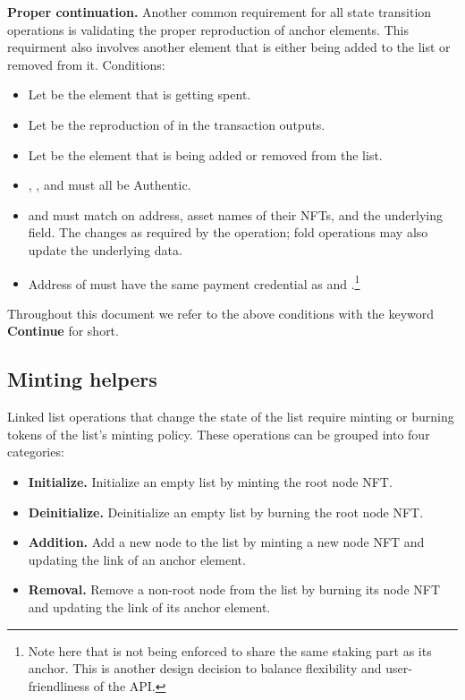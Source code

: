 \documentclass[../midgard.tex]{subfiles}
\begin{document}
\textbf{Proper continuation.} Another common requirement for all state transition operations is validating the proper reproduction of anchor elements.
This requirment also involves another element that is either being added to the list or removed from it.
Conditions:
\begin{itemize}
  \item Let  be the element that is getting spent.
  \item Let  be the reproduction of  in the transaction outputs.
  \item Let  be the element that is being added or removed from the list.
  \item {}, , and  must all be Authentic.
  \item {} and  must match on address, asset names of their NFTs, and the underlying  field. The  changes as required by the operation; fold operations may also update the underlying data.
  \item Address of  must have the same payment credential as  and .\footnote{Note here that  is not being enforced to share the same staking part as its anchor.
    This is another design decision to balance flexibility and user-friendliness of the API.}
\end{itemize}

Throughout this document we refer to the above conditions with the keyword \textbf{Continue} for short.

\subsection{Minting helpers}
\label{h:list-minting-helpers}

Linked list operations that change the state of the list require minting or burning tokens of the list's minting policy.
These operations can be grouped into four categories:
\begin{itemize}
  \item \textbf{Initialize.} Initialize an empty list by minting the root node NFT.
  \item \textbf{Deinitialize.} Deinitialize an empty list by burning the root node NFT.
  \item \textbf{Addition.} Add a new node to the list by minting a new node NFT and updating the link of an anchor element.
  \item \textbf{Removal.} Remove a non-root node from the list by burning its node NFT and updating the link of its anchor element.
\end{itemize}
\end{document}
